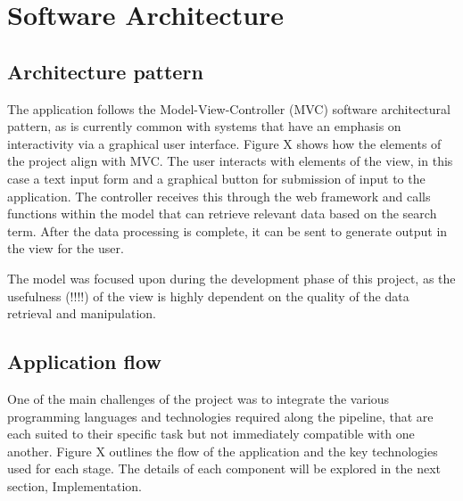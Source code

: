 \documentclass[Report.tex]{subfiles}
\begin{document}
\chapter{Software Architecture}
\section{Architecture pattern}
The application follows the Model-View-Controller (MVC) software architectural pattern, as is currently common with systems that have an emphasis on interactivity via a graphical user interface. Figure X shows how the elements of the project align with MVC. The user interacts with elements of the view, in this case a text input form and a graphical button for submission of input to the application. The controller receives this through the web framework and calls functions within the model that can retrieve relevant data based on the search term. After the data processing is complete, it can be sent to generate output in the view for the user. \newline

\noindent The model was focused upon during the development phase of this project, as the usefulness (!!!!) of the view is highly dependent on the quality of the data retrieval and manipulation. 

\section{Application flow}
One of the main challenges of the project was to integrate the various programming languages and technologies required along the pipeline, that are each suited to their specific task but not immediately compatible with one another. Figure X outlines the flow of the application and the key technologies used for each stage. The details of each component will be explored in the next section, Implementation.
\end{document}
